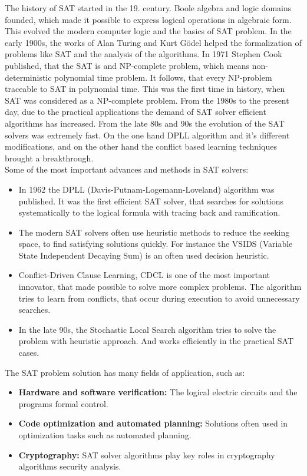 \documentclass[12pt] {article}
\begin{document}
The history of SAT started in the 19. century. Boole algebra and logic domains founded, which made it possible to express logical operations in algebraic form. This evolved the modern computer logic and the basics of SAT problem. In the early 1900s, the works of Alan Turing and Kurt Gödel helped the formalization of problems like SAT and the analysis of the algorithms. In 1971 Stephen Cook published, that the SAT is and NP-complete problem, which means non-deterministic polynomial time problem. It follows, that every NP-problem traceable to SAT in polynomial time. This was the first time in history, when SAT was considered as a NP-complete problem. From the 1980s to the present day, due to the practical applications the demand of SAT solver efficient algorithms has increased. From the late 80s and 90s the evolution of the SAT solvers was extremely fast. On the one hand DPLL algorithm and it's different modifications, and on the other hand the conflict based learning techniques brought a breakthrough.
\\Some of the most important advances and methods in SAT solvers:
\begin{itemize}
    \item In 1962 the DPLL (Davis-Putnam-Logemann-Loveland) algorithm was published. It was the first efficient SAT solver, that searches for solutions systematically to the logical formula with tracing back and ramification.
    \item The modern SAT solvers often use heuristic methods to reduce the seeking space, to find satisfying solutions quickly. For instance the VSIDS (Variable State Independent Decaying Sum) is an often used decision heuristic.
    \item Conflict-Driven Clause Learning, CDCL is one of the most important innovator, that made possible to solve more complex problems. The algorithm tries to learn from conflicts, that occur during execution to avoid unnecessary searches.
    \item In the late 90s, the Stochastic Local Search algorithm tries to solve the problem with heuristic approach. And works efficiently in the practical SAT cases.
\end{itemize}
The SAT problem solution has many fields of application, such as:
\begin{itemize}
    \item \textbf{Hardware and software verification:} The logical electric circuits and the programs formal control.
    \item \textbf{Code optimization and automated planning:} Solutions often used in optimization tasks such as automated planning.
    \item \textbf{Cryptography:} SAT solver algorithms play key roles in cryptography algorithms security analysis.
\end{itemize}
\end{document}

